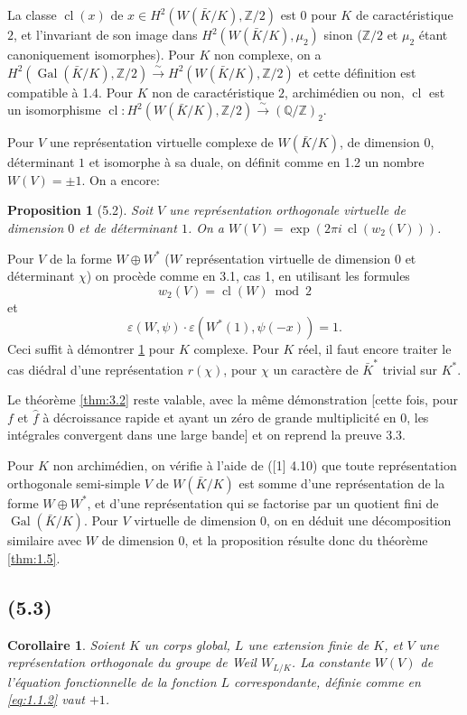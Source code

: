 \documentclass[11pt]{amsart}
\theoremstyle{plain}
\newtheorem{proposition}[theoreme]{Proposition}
\newtheorem{corollaire}[theoreme]{Corollaire}
\theoremstyle{definition}
\DeclareMathOperator{\Gal}{Gal}
\DeclareMathOperator{\cl}{cl}
\newcommand{\Z}{\mathbb{Z}}
\newcommand{\Q}{\mathbb{Q}}
\begin{document}
La classe $\cl(x)$ de $x\in H^2(W(\bar K/K),\Z/2)$ est $0$ pour $K$ de caract\'eristique $2$, et l'invariant de son image dans $H^2(W(\bar K/K),\mu_2)$ sinon ($\Z/2$ et $\mu_2$ \'etant canoniquement isomorphes). Pour $K$ non complexe, on a $H^2(\Gal(\bar K/K),\Z/2)\xrightarrow{\sim}H^2(W(\bar K/K),\Z/2)$ et cette d\'efinition est compatible \`a 1.4. Pour $K$ non de caract\'eristique $2$, archim\'edien ou non, $\cl$ est un isomorphisme $\cl\colon H^2(W(\bar K/K),\Z/2)\xrightarrow{\sim}(\Q/\Z)_2$.

Pour $V$ une repr\'esentation virtuelle complexe de $W(\bar K/K)$, de dimension $0$, d\'eterminant $1$ et isomorphe \`a sa duale, on d\'efinit comme en 1.2 un nombre $W(V)=\pm1$. On a encore:

\begin{proposition}[5.2]\label{prop:5.2}
Soit $V$ une repr\'esentation orthogonale virtuelle de dimension $0$ et de d\'eterminant $1$. On a $W(V)=\exp(2\pi i\,\cl(w_2(V)))$.
\end{proposition}

Pour $V$ de la forme $W\oplus W^*$ ($W$ repr\'esentation virtuelle de dimension $0$ et d\'eterminant $\chi$) on proc\`ede comme en 3.1, cas 1, en utilisant les formules
\[
w_2(V)=\cl(W)\bmod 2
\]
et
\[
\varepsilon(W,\psi)\cdot\varepsilon(W^*(1),\psi(-x))=1.
\]
Ceci suffit \`a d\'emontrer \ref{prop:5.2} pour $K$ complexe. Pour $K$ r\'eel, il faut encore traiter le cas di\'edral d'une repr\'esentation $r(\chi)$, pour $\chi$ un caract\`ere de $\bar K^*$ trivial sur $K^*$.

Le th\'eor\`eme \ref{thm:3.2} reste valable, avec la m\^eme d\'emonstration [cette fois, pour $f$ et $\hat{f}$ \`a d\'ecroissance rapide et ayant un z\'ero de grande multiplicit\'e en $0$, les int\'egrales convergent dans une large bande] et on reprend la preuve 3.3.

Pour $K$ non archim\'edien, on v\'erifie \`a l'aide de ([1] 4.10) que toute repr\'esentation orthogonale semi-simple $V$ de $W(\bar K/K)$ est somme d'une repr\'esentation de la forme $W\oplus W^*$, et d'une repr\'esentation qui se factorise par un quotient fini de $\Gal(\bar K/K)$. Pour $V$ virtuelle de dimension $0$, on en d\'eduit une d\'ecomposition similaire avec $W$ de dimension $0$, et la proposition r\'esulte donc du th\'eor\`eme \ref{thm:1.5}.

\subsection{(5.3)}
\begin{corollaire}\label{cor:5.3}
Soient $K$ un corps global, $L$ une extension finie de $K$, et $V$ une repr\'esentation orthogonale du groupe de Weil $W_{L/K}$. La constante $W(V)$ de l'\'equation fonctionnelle de la fonction $L$ correspondante, d\'efinie comme en \eqref{eq:1.1.2} vaut $+1$.
\end{corollaire}
\end{document}
